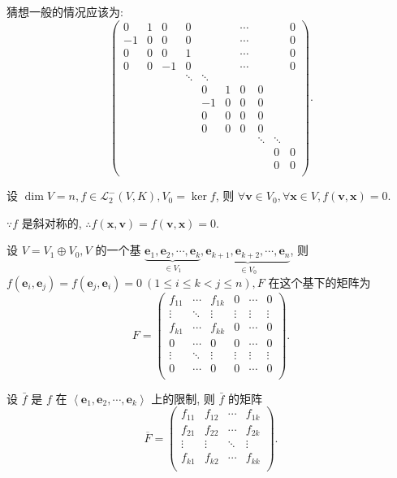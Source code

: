 \documentclass{ctexart}
\begin{document}
猜想一般的情况应该为:
\[\begin{pmatrix}
    0  & 1 & 0  & 0 &&& \cdots &&& 0 \\
    -1 & 0 & 0  & 0 &&& \cdots &&& 0 \\
    0  & 0 & 0  & 1 &&& \cdots &&& 0 \\
    0  & 0 & -1 & 0 &&& \cdots &&& 0 \\
    &&& \ddots & \ddots \\
    &&&& 0  & 1 & 0 & 0 \\
    &&&& -1 & 0 & 0 & 0 \\
    &&&& 0  & 0 & 0 & 0 \\
    &&&& 0  & 0 & 0 & 0 \\
    &&&&&&& \ddots & \ddots \\
    &&&&&&&& 0 & 0 \\
    &&&&&&&& 0 & 0 \\
\end{pmatrix}.\]

设 $\dim V=n,f\in\mathcal{L}_2^-(V,K),V_0=\ker f$, 则 $\forall\boldsymbol{v}\in V_0,\forall\boldsymbol{x}\in V,f(\boldsymbol{v},\boldsymbol{x})=0$.

$\because f$ 是斜对称的, $\therefore f(\boldsymbol{x},\boldsymbol{v})=f(\boldsymbol{v},\boldsymbol{x})=0$.

设 $V=V_1\oplus V_0,V$ 的一个基 $\underbrace{\boldsymbol{e}_1,\boldsymbol{e}_2,\cdots,\boldsymbol{e}_k}_{\in V_1},\underbrace{\boldsymbol{e}_{k+1},\boldsymbol{e}_{k+2},\cdots,\boldsymbol{e}_n}_{\in V_0}$, 则 $f(\boldsymbol{e}_i,\boldsymbol{e}_j)=f(\boldsymbol{e}_j,\boldsymbol{e}_i)=0\ (1\leq i \leq k<j\leq n),F$ 在这个基下的矩阵为
\[F=\begin{pmatrix}
    f_{11} & \cdots & f_{1k} & 0 & \cdots & 0 \\
    \vdots & \ddots & \vdots & \vdots & \vdots & \vdots \\
    f_{k1} & \cdots & f_{kk} & 0 & \cdots & 0 \\
    0      & \cdots & 0      & 0 & \cdots & 0 \\
    \vdots & \ddots & \vdots & \vdots & \vdots & \vdots \\
    0      & \cdots & 0      & 0 & \cdots & 0 \\
\end{pmatrix}.\]

设 $\bar{f}$ 是 $f$ 在 $\left<\boldsymbol{e}_1,\boldsymbol{e}_2,\cdots,\boldsymbol{e}_k\right>$ 上的限制, 则 $\bar{f}$ 的矩阵
\[\overline{F}=\begin{pmatrix}
    f_{11} & f_{12} & \cdots & f_{1k} \\
    f_{21} & f_{22} & \cdots & f_{2k} \\
    \vdots & \vdots & \ddots & \vdots \\
    f_{k1} & f_{k2} & \cdots & f_{kk} \\
\end{pmatrix}.\]
\end{document}
